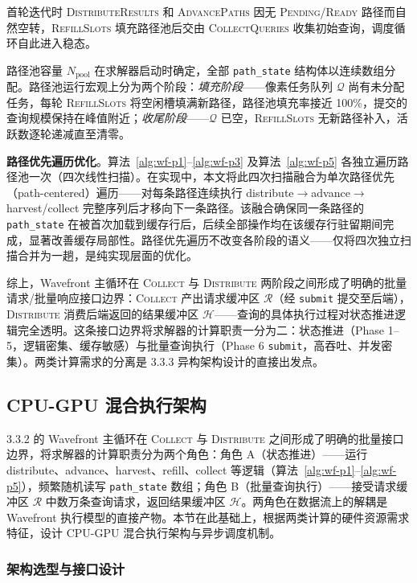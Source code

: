 首轮迭代时 \textsc{DistributeResults} 和 \textsc{AdvancePaths} 因无 \textsc{Pending}/\textsc{Ready} 路径而自然空转，\textsc{RefillSlots} 填充路径池后交由 \textsc{CollectQueries} 收集初始查询，调度循环自此进入稳态。

路径池容量 $N_\text{pool}$ 在求解器启动时确定，全部 \texttt{path\_state} 结构体以连续数组分配。路径池运行宏观上分为两个阶段：\textit{填充阶段}——像素任务队列 $\mathcal{Q}$ 尚有未分配任务，每轮 \textsc{RefillSlots} 将空闲槽填满新路径，路径池填充率接近 100\%，提交的查询规模保持在峰值附近；\textit{收尾阶段}——$\mathcal{Q}$ 已空，\textsc{RefillSlots} 无新路径补入，活跃数逐轮递减直至清零。

\textbf{路径优先遍历优化}。算法~\ref{alg:wf-p1}--\ref{alg:wf-p3} 及算法~\ref{alg:wf-p5} 各独立遍历路径池一次（四次线性扫描）。在实现中，本文将此四次扫描融合为单次路径优先（path-centered）遍历——对每条路径连续执行 distribute$\to$advance$\to$harvest/collect 完整序列后才移向下一条路径。该融合确保同一条路径的 \texttt{path\_state} 在被首次加载到缓存行后，后续全部操作均在该缓存行驻留期间完成，显著改善缓存局部性。路径优先遍历不改变各阶段的语义——仅将四次独立扫描合并为一趟，是纯实现层面的优化。

综上，Wavefront 主循环在 \textsc{Collect} 与 \textsc{Distribute} 两阶段之间形成了明确的批量请求/批量响应接口边界：\textsc{Collect} 产出请求缓冲区 $\mathcal{R}$（经 \texttt{submit} 提交至后端），\textsc{Distribute} 消费后端返回的结果缓冲区 $\mathcal{H}$——查询的具体执行过程对状态推进逻辑完全透明。这条接口边界将求解器的计算职责一分为二：状态推进（Phase 1--5，逻辑密集、缓存敏感）与批量查询执行（Phase 6 \texttt{submit}，高吞吐、并发密集）。两类计算需求的分离是 3.3.3 异构架构设计的直接出发点。

\subsection{CPU-GPU 混合执行架构}
\label{subsec:hybrid-arch}

3.3.2 的 Wavefront 主循环在 \textsc{Collect} 与 \textsc{Distribute} 之间形成了明确的批量接口边界，将求解器的计算职责分为两个角色：角色 A（状态推进）——运行 distribute、advance、harvest、refill、collect 等逻辑（算法~\ref{alg:wf-p1}--\ref{alg:wf-p5}），频繁随机读写 \texttt{path\_state} 数组；角色 B（批量查询执行）——接受请求缓冲区 $\mathcal{R}$ 中数万条查询请求，返回结果缓冲区 $\mathcal{H}$。两角色在数据流上的解耦是 Wavefront 执行模型的直接产物。本节在此基础上，根据两类计算的硬件资源需求特征，设计 CPU-GPU 混合执行架构与异步调度机制。

\subsubsection{架构选型与接口设计}

